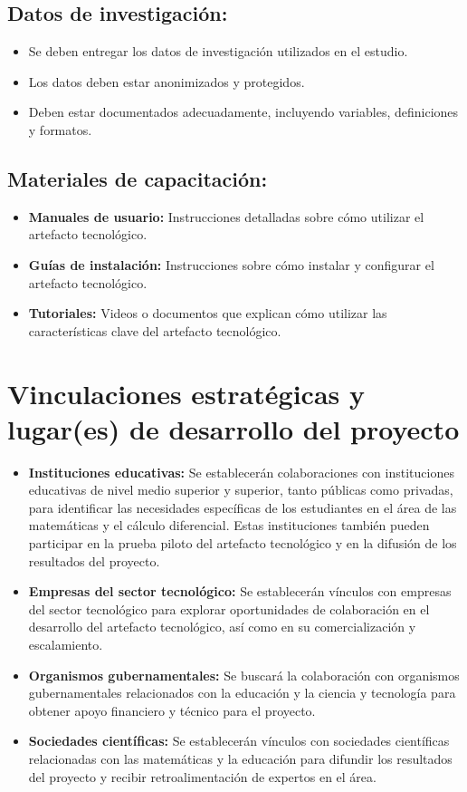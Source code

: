 \documentclass{article}
\begin{document}
\subsection{Datos de investigación:}
\begin{itemize}
  \item Se deben entregar los datos de investigación utilizados en el estudio.
  \item Los datos deben estar anonimizados y protegidos.
  \item Deben estar documentados adecuadamente, incluyendo variables, definiciones y formatos.
\end{itemize}

\subsection{Materiales de capacitación:}
\begin{itemize}
  \item \textbf{Manuales de usuario:} Instrucciones detalladas sobre cómo utilizar el artefacto tecnológico.
  \item \textbf{Guías de instalación:} Instrucciones sobre cómo instalar y configurar el artefacto tecnológico.
  \item \textbf{Tutoriales:} Videos o documentos que explican cómo utilizar las características clave del artefacto tecnológico.
\end{itemize}

\section{Vinculaciones estratégicas y lugar(es) de desarrollo del proyecto}
\begin{itemize}
  \item \textbf{Instituciones educativas:} Se establecerán colaboraciones con instituciones educativas de nivel medio superior y superior, tanto públicas como privadas, para identificar las necesidades específicas de los estudiantes en el área de las matemáticas y el cálculo diferencial. Estas instituciones también pueden participar en la prueba piloto del artefacto tecnológico y en la difusión de los resultados del proyecto.
  \item \textbf{Empresas del sector tecnológico:} Se establecerán vínculos con empresas del sector tecnológico para explorar oportunidades de colaboración en el desarrollo del artefacto tecnológico, así como en su comercialización y escalamiento.
  \item \textbf{Organismos gubernamentales:} Se buscará la colaboración con organismos gubernamentales relacionados con la educación y la ciencia y tecnología para obtener apoyo financiero y técnico para el proyecto.
  \item \textbf{Sociedades científicas:} Se establecerán vínculos con sociedades científicas relacionadas con las matemáticas y la educación para difundir los resultados del proyecto y recibir retroalimentación de expertos en el área.
\end{itemize}
\end{document}
